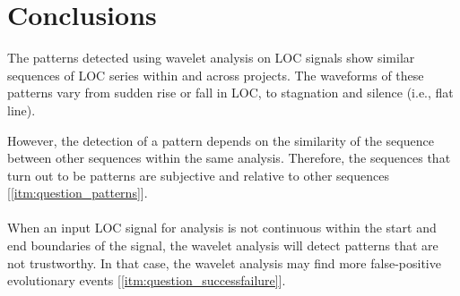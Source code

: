 \begin{comment}
\paragraph{}
The four patterns with the most common maximum LOC differences are shown in
Figure \ref{figure:top_patterns_plots} to illustrate how such patterns look
like. The figure depicts the wavelets of the patterns for all the project
signals they were detected in. Which are the differences in LOC values between
two subsequent coefficients.



The graphs show that the sequences have similar waveforms. Each graph contains
a multiple of plotted sequences: pattern 1 contains 216 sequences; pattern 2
contains 156 sequences; pattern 3 contains 151 sequences; and pattern 4 contains
141 sequences. Note that the factor of scale is reintroduced, because the
sequences all contain scale/filter coefficients. The factor of time, however,
is still being eliminated, hence the use of \emph{index }\rm instead of a time
metric on the horizontal axis.
\end{comment}

\section{Conclusions}

The patterns detected using wavelet analysis on LOC signals show similar
sequences of LOC series within and across projects. The waveforms of these
patterns vary from sudden rise or fall in LOC, to stagnation and silence (i.e.,
flat line).

However, the detection of a pattern depends on the similarity of the sequence
between other sequences within the same analysis. Therefore, the sequences that
turn out to be patterns are subjective and relative to other sequences
[\ref{itm:question_patterns}].

\paragraph{}
When an input LOC signal for analysis is not continuous within the start
and end boundaries of the signal, the wavelet analysis will detect patterns
that are not trustworthy. In that case, the wavelet analysis may find
more false-positive evolutionary events [\ref{itm:question_successfailure}].

